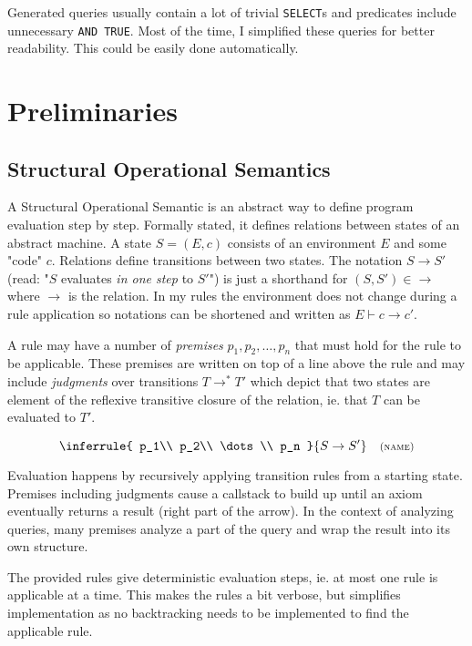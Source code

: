 Generated queries usually contain a lot of trivial \texttt{SELECT}s and predicates include unnecessary \texttt{AND TRUE}. Most of the time, I simplified these queries for better readability. This could be easily done automatically.

\section{Preliminaries}\label{approach}

\subsection{Structural Operational Semantics}

A Structural Operational Semantic is an abstract way to define program evaluation step by step. Formally stated, it defines relations between states of an abstract machine. A state $S = (E, c)$ consists of an environment $E$ and some "code" $c$. Relations define transitions between two states. The notation $S \rightarrow S'$ (read: "$S$ evaluates \textit{in one step} to $S'$") is just a shorthand for $(S, S') \in \rightarrow$ where $\rightarrow$ is the relation. In my rules the environment does not change during a rule application so notations can be shortened and written as $E \vdash c \rightarrow c'$. \cite[Chapter 2]{semanticsWithApplications}

A rule may have a number of \textit{premises} $p_1, p_2, \dots, p_n$ that must hold for the rule to be applicable. These premises are written on top of a line above the rule and may include \textit{judgments} over transitions $T \rightarrow^* T'$ which depict that two states are element of the reflexive transitive closure of the relation, ie. that $T$ can be evaluated to $T'$.

$$\inferrule{
   p_1\\
   p_2\\
   \dots\\
   p_n
}{
    S \rightarrow S'
}\quad\footnotesize{\textsc{(name)}}$$

Evaluation happens by recursively applying transition rules from a starting state. Premises including judgments cause a callstack to build up until an axiom eventually returns a result (right part of the arrow). In the context of analyzing queries, many premises analyze a part of the query and wrap the result into its own structure.

The provided rules give deterministic evaluation steps, ie. at most one rule is applicable at a time. This makes the rules a bit verbose, but simplifies implementation as no backtracking needs to be implemented to find the applicable rule.

